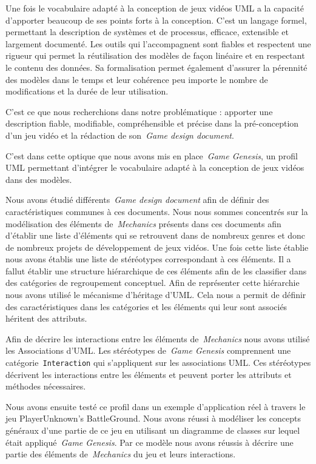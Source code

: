 \begin{conclusion}
Une fois le vocabulaire adapté à la conception de jeux vidéos UML a la capacité d'apporter beaucoup de ses points forts à la conception.
C'est un langage formel, permettant la description de systèmes et de processus, efficace, extensible et largement documenté.
Les outils qui l'accompagnent sont fiables et respectent une rigueur qui permet la réutilisation des modèles de façon linéaire et en respectant le contenu des données.
Sa formalisation permet également d'assurer la pérennité des modèles dans le temps et leur cohérence peu importe le nombre de modifications et la durée de leur utilisation.

C'est ce que nous recherchions dans notre problématique : apporter une description fiable, modifiable, compréhensible et précise dans la pré-conception d'un jeu vidéo et la rédaction de son~\emph{Game design document}.

C'est dans cette optique que nous avons mis en place~\emph{Game Genesis}, un profil UML permettant d'intégrer le vocabulaire adapté à la conception de jeux vidéos dans des modèles.

Nous avons étudié différents~\emph{Game design document} afin de définir des caractéristiques communes à ces documents.
Nous nous sommes concentrés sur la modélisation des éléments de~\emph{Mechanics} présents dans ces documents afin d'établir une liste d'éléments qui se retrouvent dans de nombreux genres et donc de nombreux projets de développement de jeux vidéos.
Une fois cette liste établie nous avons établis une liste de stéréotypes correspondant à ces éléments.
Il a fallut établir une structure hiérarchique de ces éléments afin de les classifier dans des catégories de regroupement conceptuel.
Afin de représenter cette hiérarchie nous avons utilisé le mécanisme d'héritage d'UML.
Cela nous a permit de définir des caractéristiques dans les catégories et les éléments qui leur sont associés héritent des attributs.

Afin de décrire les interactions entre les éléments de~\emph{Mechanics} nous avons utilisé les Associations d'UML.
Les stéréotypes de~\emph{Game Genesis} comprennent une catégorie~\texttt{Interaction} qui s'appliquent sur les associations UML.
Ces stéréotypes décrivent les interactions entre les éléments et peuvent porter les attributs et méthodes nécessaires.

Nous avons ensuite testé ce profil dans un exemple d'application réel à travers le jeu PlayerUnknown's BattleGround.
Nous avons réussi à modéliser les concepts généraux d'une partie de ce jeu en utilisant un diagramme de classes sur lequel était appliqué~\emph{Game Genesis}.
Par ce modèle nous avons réussis à décrire une partie des éléments de~\emph{Mechanics} du jeu et leurs interactions.


\end{conclusion}
